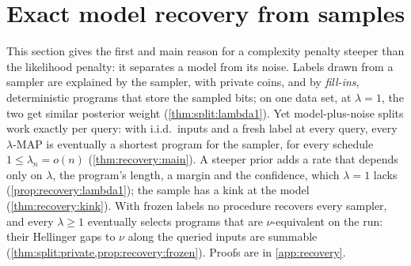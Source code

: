 \section{Exact model recovery from samples}\label{sec:recovery}\label{sec:split}

This section gives the first and main reason for a complexity penalty steeper than the likelihood penalty: it separates a model from its noise. Labels drawn from a sampler are explained by the sampler, with private coins, and by \emph{fill-ins}, deterministic programs that store the sampled bits; on one data set, at $\lambda=1$, the two get similar posterior weight (\cref{thm:split:lambda1}). Yet model-plus-noise splits work exactly per query: with i.i.d.\ inputs and a fresh label at every query, every $\lambda$-MAP is eventually a shortest program for the sampler, for every schedule $1\le\lambda_n=o(n)$ (\cref{thm:recovery:main}). A steeper prior adds a rate that depends only on $\lambda$, the program's length, a margin and the confidence, which $\lambda=1$ lacks (\cref{prop:recovery:lambda1}); the sample has a kink at the model (\cref{thm:recovery:kink}). With frozen labels no procedure recovers every sampler, and every $\lambda\ge1$ eventually selects programs that are $\nu$-equivalent on the run: their Hellinger gaps to $\nu$ along the queried inputs are summable (\cref{thm:split:private,prop:recovery:frozen}). Proofs are in \cref{app:recovery}.

